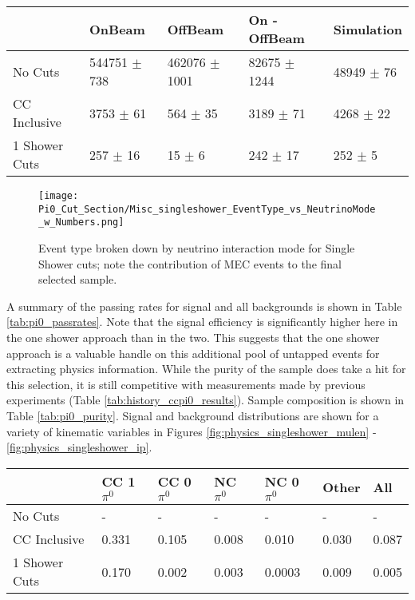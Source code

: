 \begin{table}[H] 
 \centering
 \begin{tabular}{| l | l | l | l | l |}
  \hline
   & OnBeam & OffBeam & On - OffBeam & Simulation \\ [0.1ex] \hline
No Cuts & 544751 $\pm$ 738 & 462076 $\pm$ 1001 & 82675 $\pm$ 1244 & 48949 $\pm$ 76 \\ 
CC Inclusive & 3753 $\pm$ 61 & 564 $\pm$ 35  & 3189 $\pm$ 71 & 4268 $\pm$ 22  \\ 
1 Shower Cuts & 257 $\pm$ 16 & 15 $\pm$ 6 & 242 $\pm$ 17 & 252 $\pm$ 5  \\ \hline
\end{tabular}
 \end{table}


\begin{figure}[H]
\centering
\texttt{[image: Pi0\_Cut\_Section/Misc\_singleshower\_EventType\_vs\_NeutrinoMode\_w\_Numbers.png]}
\caption{ Event type broken down by neutrino interaction mode for Single Shower cuts; note the contribution of MEC events to the final selected sample. }
\label{fig:physics_singleshower_inttype}
\end{figure}


\par A summary of the passing rates for signal and all backgrounds is shown in Table \ref{tab:pi0_passrates}.  Note that the signal efficiency is significantly higher here in the one shower approach than in the two. This suggests that the one shower approach is a valuable handle on this additional pool of untapped events for extracting physics information. While the purity of the sample does take a hit for this selection, it is still competitive with measurements made by previous experiments (Table \ref{tab:history_ccpi0_results}). Sample composition is shown in Table \ref{tab:pi0_purity}.  Signal and background distributions are shown for a variety of kinematic variables in Figures \ref{fig:physics_singleshower_mulen} - \ref{fig:physics_singleshower_ip}.


\begin{table}[H]
\centering
{}
 \begin{tabular}{| l | l | l |l|l|l|l|}
 \hline
 & CC 1$\pi^0$ & CC 0$\pi^0$ & NC $\pi^0$ & NC 0$\pi^0$ & Other & All \\ [0.1ex] \hline
No Cuts & - & - & - & - & - & -\\
CC Inclusive & 0.331 & 0.105 & 0.008 & 0.010 & 0.030 & 0.087 \\ 
1 Shower Cuts & 0.170 & 0.002 & 0.003 & 0.0003 & 0.009 & 0.005 \\ \hline
\end{tabular}
\end{table}

